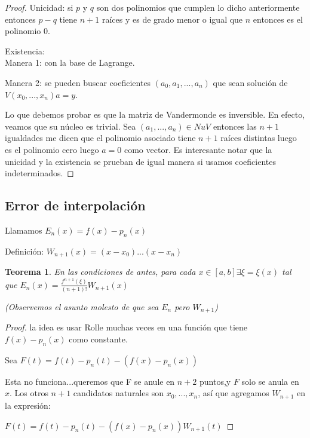 \documentclass[10pt,a4paper,final]{report}
\newtheorem{theorem}{Teorema}
\begin{document}
{\begin{proof}

Unicidad: si $p$ y $q$ son dos polinomios que cumplen lo dicho anteriormente entonces $p-q$ tiene $n+1$ raíces y es de grado menor o igual que $n$ entonces es el polinomio 0.


Existencia: \\

Manera 1: con la base de Lagrange.

Manera 2: se pueden buscar coeficientes $(a_0,a_1,...,a_n)$ que sean solución de $V(x_0,...,x_n) a = y$.

Lo que debemos probar es que la matriz de Vandermonde es inversible. En efecto, veamos que su núcleo es trivial. Sea $(a_1,...,a_n) \in Nu V$ entonces las $n+1$ igualdades me dicen que el polinomio asociado tiene $n+1$ raíces distintas luego es el polinomio cero luego $a=0$ como vector. Es interesante notar que la unicidad y la existencia se prueban de igual manera si usamos coeficientes indeterminados.


\end{proof}

\subsection{Error de interpolación}

Llamamos $E_n(x) = f(x) - p_n(x)$

Definición: $W_{n+1}(x)=(x-x_0)...(x-x_n)$


\begin{theorem} En las condiciones de antes, para cada $x \in [a,b] \exists \xi=\xi(x)$ tal que $E_n(x) = \frac{f^{n+1}(\xi)}{(n+1)!} W_{n+1}(x)$

(Observemos el asunto molesto de que sea $E_n$ pero $W_{n+1}$)\\

\end{theorem}

\begin{proof}la idea es usar Rolle muchas veces en una función que tiene $f(x)-p_n(x)$ como constante.


Sea $F(t) = f(t) - p_n(t) - (f(x) - p_n(x))$

Esta no funciona...queremos que F se anule en $n+2$ puntos,y $F$ solo se anula en $x$. Los otros $n+1$ candidatos naturales son $x_0,...,x_n$, así que agregamos $W_{n+1}$ en la expresión:

$F(t) = f(t) - p_n(t) - (f(x) - p_n(x)) W_{n+1}(t)$


\end{proof}}
\end{document}
